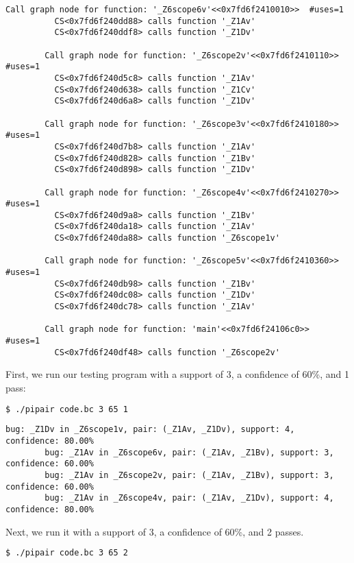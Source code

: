\documentclass{article}
\begin{document}
\begin{enumerate}[(a)]
\begin{lstlisting}[basicstyle=\small\ttfamily]
        Call graph node for function: '_Z6scope6v'<<0x7fd6f2410010>>  #uses=1
          CS<0x7fd6f240dd88> calls function '_Z1Av'
          CS<0x7fd6f240ddf8> calls function '_Z1Dv'

        Call graph node for function: '_Z6scope2v'<<0x7fd6f2410110>>  #uses=1
          CS<0x7fd6f240d5c8> calls function '_Z1Av'
          CS<0x7fd6f240d638> calls function '_Z1Cv'
          CS<0x7fd6f240d6a8> calls function '_Z1Dv'

        Call graph node for function: '_Z6scope3v'<<0x7fd6f2410180>>  #uses=1
          CS<0x7fd6f240d7b8> calls function '_Z1Av'
          CS<0x7fd6f240d828> calls function '_Z1Bv'
          CS<0x7fd6f240d898> calls function '_Z1Dv'

        Call graph node for function: '_Z6scope4v'<<0x7fd6f2410270>>  #uses=1
          CS<0x7fd6f240d9a8> calls function '_Z1Bv'
          CS<0x7fd6f240da18> calls function '_Z1Av'
          CS<0x7fd6f240da88> calls function '_Z6scope1v'

        Call graph node for function: '_Z6scope5v'<<0x7fd6f2410360>>  #uses=1
          CS<0x7fd6f240db98> calls function '_Z1Bv'
          CS<0x7fd6f240dc08> calls function '_Z1Dv'
          CS<0x7fd6f240dc78> calls function '_Z1Av'

        Call graph node for function: 'main'<<0x7fd6f24106c0>>  #uses=1
          CS<0x7fd6f240df48> calls function '_Z6scope2v'
      \end{lstlisting}

      First, we run our testing program with a support of 3, a confidence of 60\%, and 1 pass:
      \begin{lstlisting}[language=bash]
        $ ./pipair code.bc 3 65 1
      \end{lstlisting}

      \begin{lstlisting}[basicstyle=\small\ttfamily]
        bug: _Z1Dv in _Z6scope1v, pair: (_Z1Av, _Z1Dv), support: 4, confidence: 80.00%
        bug: _Z1Av in _Z6scope6v, pair: (_Z1Av, _Z1Bv), support: 3, confidence: 60.00%
        bug: _Z1Av in _Z6scope2v, pair: (_Z1Av, _Z1Bv), support: 3, confidence: 60.00%
        bug: _Z1Av in _Z6scope4v, pair: (_Z1Av, _Z1Dv), support: 4, confidence: 80.00%
      \end{lstlisting}

      Next, we run it with a support of 3, a confidence of 60\%, and 2 passes.
      \begin{lstlisting}[language=bash]
        $ ./pipair code.bc 3 65 2
      \end{lstlisting}


\end{enumerate}
\end{document}

